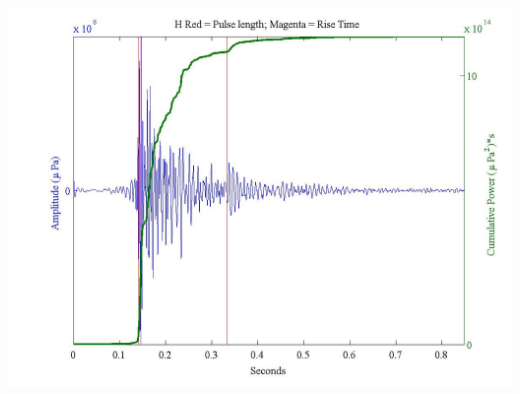 \documentclass[11pt]{report}
\begin{document}
\begin{center}
\includegraphics[width = \textwidth ]{8.jpeg}
\end{center}
\end{document}
